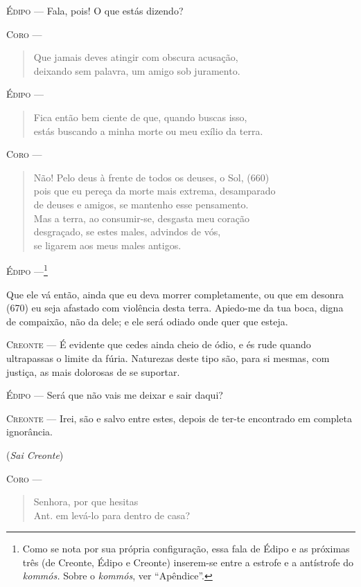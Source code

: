 \textsc{Édipo} --- Fala, pois! O que estás dizendo?

\textsc{Coro} --- \begin{verse}Que jamais deves atingir com obscura acusação,\\
deixando sem palavra, um amigo sob juramento.
\end{verse}

\textsc{Édipo} --- \begin{verse}Fica então bem ciente de que, quando buscas isso,\\
estás buscando a minha morte ou meu exílio da terra.
\end{verse}

\textsc{Coro} --- \begin{verse}Não! Pelo deus à frente de todos os deuses, o Sol, (660)\\
pois que eu pereça da morte mais extrema, desamparado\\
de deuses e amigos, se mantenho esse pensamento.\\
Mas a terra, ao consumir-se, desgasta meu coração\\
desgraçado, se estes males, advindos de vós,\\
se ligarem aos meus males antigos.
\end{verse}

\textsc{Édipo} ---\footnote{Como se nota por sua própria configuração, essa
  fala de Édipo e as próximas três (de Creonte, Édipo e Creonte)
  inserem-se entre a estrofe e a antístrofe do \emph{kommós.} Sobre o
  \emph{kommós}, ver ``Apêndice''.}

Que ele vá então, ainda que eu deva morrer completamente, ou que em
desonra (670) eu seja afastado com violência desta terra. Apiedo-me da
tua boca, digna de compaixão, não da dele; e ele será odiado onde quer
que esteja.

\textsc{Creonte} --- É evidente que cedes ainda cheio de ódio, e és rude quando ultrapassas o
limite da fúria. Naturezas deste tipo são, para si mesmas, com justiça,
as mais dolorosas de se suportar.

\textsc{Édipo} --- Será que não vais me deixar e sair daqui?

\textsc{Creonte} --- Irei, são e salvo entre estes, depois de ter-te encontrado em completa
ignorância.

(\emph{Sai Creonte})

\textsc{Coro} --- \begin{verse}Senhora, por que hesitas\\ Ant.
em levá-lo para dentro de casa?
\end{verse}

